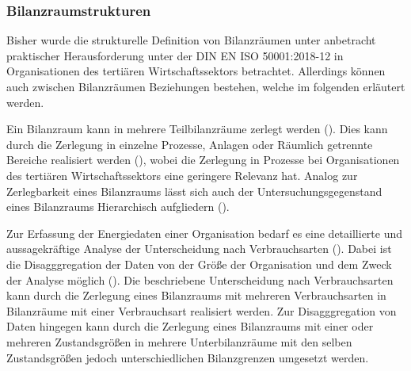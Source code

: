 \subsubsection{Bilanzraumstrukturen}
Bisher wurde die strukturelle Definition von Bilanzräumen unter anbetracht praktischer Herausforderung unter der DIN EN ISO 50001:2018-12 in Organisationen 
des tertiären Wirtschaftssektors betrachtet. Allerdings können auch zwischen Bilanzräumen Beziehungen bestehen, welche im folgenden erläutert werden.

Ein Bilanzraum kann in mehrere Teilbilanzräume zerlegt werden (\cite[S. 310]{Engelmann.2015}). Dies kann durch die Zerlegung in einzelne Prozesse, 
Anlagen oder Räumlich getrennte Bereiche realisiert werden (\cite[S. 310]{Engelmann.2015}), wobei die Zerlegung in Prozesse bei Organisationen des tertiären 
Wirtschaftssektors eine geringere Relevanz hat.
Analog zur Zerlegbarkeit eines Bilanzraums lässt sich auch der Untersuchungsgegenstand eines Bilanzraums Hierarchisch aufgliedern (\cite[S. 109]{Miller.2016}).

Zur Erfassung der Energiedaten einer Organisation bedarf es eine detaillierte und aussagekräftige Analyse der Unterscheidung nach Verbrauchsarten 
(\cite[S. 14]{Hohnhold.2013}). Dabei ist die Disagggregation der Daten von der Größe der Organisation und dem Zweck der Analyse möglich (\cite[S. 14f.]{Hohnhold.2013}).
Die beschriebene Unterscheidung nach Verbrauchsarten kann durch die Zerlegung eines Bilanzraums mit mehreren Verbrauchsarten in Bilanzräume mit einer Verbrauchsart 
realisiert werden. Zur Disagggregation von Daten hingegen kann durch die Zerlegung eines Bilanzraums mit einer oder mehreren Zustandsgrößen in mehrere 
Unterbilanzräume mit den selben Zustandsgrößen jedoch unterschiedlichen Bilanzgrenzen umgesetzt werden.

